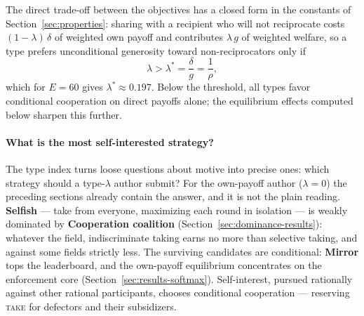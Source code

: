 The direct trade-off between the objectives has a closed form in the
constants of Section~\ref{sec:properties}: sharing with a recipient
who will not reciprocate costs $(1-\lambda)\,\delta$ of weighted own
payoff and contributes $\lambda\, g$ of weighted welfare, so a type
prefers unconditional generosity toward non-reciprocators only if
\begin{equation}
  \lambda > \lambda^* = \frac{\delta}{g} = \frac{1}{\rho},
  \label{eq:lambda-threshold}
\end{equation}
which for $E = 60$ gives $\lambda^* \approx 0.197$.
Below the threshold, all types favor conditional cooperation on direct
payoffs alone; the equilibrium effects computed below sharpen this
further.

\paragraph{What is the most self-interested strategy?}
The type index turns loose questions about motive into precise ones:
which strategy should a type-$\lambda$ author submit?
For the own-payoff author ($\lambda = 0$) the preceding sections
already contain the answer, and it is not the plain reading.
\textbf{Selfish} --- take from everyone, maximizing each round in
isolation --- is weakly dominated by \textbf{Cooperation coalition}
(Section~\ref{sec:dominance-results}): whatever the field,
indiscriminate taking earns no more than selective taking, and
against some fields strictly less.
The surviving candidates are conditional: \textbf{Mirror} tops the
leaderboard, and the own-payoff equilibrium concentrates on the
enforcement core (Section~\ref{sec:results-softmax}).
Self-interest, pursued rationally against other rational
participants, chooses conditional cooperation --- reserving
\textup{\textsc{take}} for defectors and their subsidizers.

